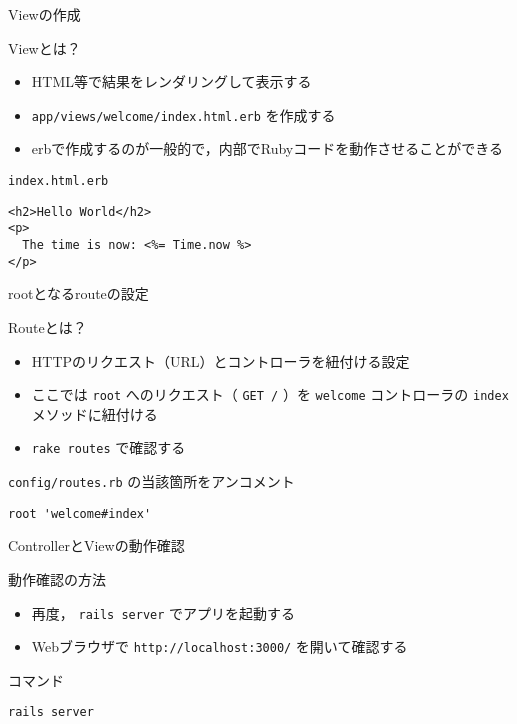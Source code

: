 \documentclass[t, aspectratio=169]{beamer}
\begin{document}
\begin{frame}[fragile,label=sec-6-2-2]{Viewの作成}
 \begin{block}{Viewとは？}
\begin{itemize}
\item HTML等で結果をレンダリングして表示する
\item \texttt{app/views/welcome/index.html.erb} を作成する
\item erbで作成するのが一般的で，内部でRubyコードを動作させることができる
\end{itemize}
\end{block}

\begin{block}{\texttt{index.html.erb}}
\begin{verbatim}
<h2>Hello World</h2>
<p>
  The time is now: <%= Time.now %>
</p>
\end{verbatim}
\end{block}
\end{frame}
\begin{frame}[fragile,label=sec-6-2-3]{rootとなるrouteの設定}
 \begin{block}{Routeとは？}
\begin{itemize}
\item HTTPのリクエスト（URL）とコントローラを紐付ける設定
\item ここでは \texttt{root} へのリクエスト（ \texttt{GET /} ）を \texttt{welcome} コントローラの \texttt{index} メソッドに紐付ける
\item \texttt{rake routes} で確認する
\end{itemize}
\end{block}

\begin{block}{\texttt{config/routes.rb} の当該箇所をアンコメント}
\begin{verbatim}
root 'welcome#index'
\end{verbatim}
\end{block}
\end{frame}
\begin{frame}[fragile,label=sec-6-2-4]{ControllerとViewの動作確認}
 \begin{block}{動作確認の方法}
\begin{itemize}
\item 再度， \texttt{rails server} でアプリを起動する
\item Webブラウザで \texttt{http://localhost:3000/} を開いて確認する
\end{itemize}
\end{block}

\begin{block}{コマンド}
\begin{verbatim}
rails server
\end{verbatim}
\end{block}
\end{frame}
\end{document}
